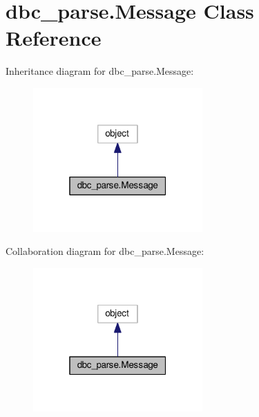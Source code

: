 \hypertarget{classdbc__parse_1_1Message}{}\section{dbc\+\_\+parse.\+Message Class Reference}
\label{classdbc__parse_1_1Message}


Inheritance diagram for dbc\+\_\+parse.\+Message\+:\nopagebreak
\begin{figure}[H]
\begin{center}
\leavevmode
\includegraphics[width=184pt]{d5/da6/classdbc__parse_1_1Message__inherit__graph}
\end{center}
\end{figure}


Collaboration diagram for dbc\+\_\+parse.\+Message\+:\nopagebreak
\begin{figure}[H]
\begin{center}
\leavevmode
\includegraphics[width=184pt]{dd/d80/classdbc__parse_1_1Message__coll__graph}
\end{center}
\end{figure}
